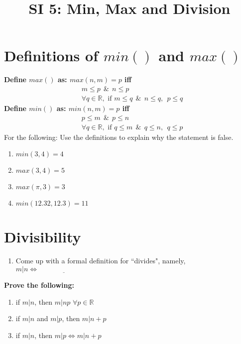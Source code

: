 \documentclass[12pt]{article}
\date{}
\author{}
\title{SI 5: Min, Max and Division}
\begin{document}
	\maketitle
	\section{Definitions of $min()$ and $max()$}
	\textbf{Define $max()$ as: $max(n,m)=p$ iff}
	\begin{align*}
		&m\le p \:\:\&\:\: n\le p\\
		&\forall{q\in\mathbb{R}},\text{ if } m\le q \:\:\&\:\: n\le q,\:\:p\le q
	\end{align*}
	\newline
	\textbf{Define $min()$ as: $min(n,m)=p$ iff}
	\begin{align*}
	& p \le m \:\: \& \:\: p \le n\\
	&\forall{q\in\mathbb{R}},\text{ if } q \le m \:\: \& \:\: q \le n,\:\:q \le p
	\end{align*}
	\newline
	For the following: Use the definitions to explain why the statement is false.
	\begin{enumerate}
		\item $min(3,4)=4$
		\item $max(3,4)=5$
		\item $max(\pi, 3)=3$
		\item $min(12.32,12.3)=11$
	\end{enumerate}
	
	\section{Divisibility}
	\begin{enumerate}[resume]
		\item Come up with a formal definition for ``divides", namely, $m|n \iff\underline{\hspace{3cm}}$
	\end{enumerate}
	\textbf{Prove the following:}
	\begin{enumerate}[resume]
		\item if $ m|n$, then $m|np$ $ \forall{p \in \mathbb{R}}$
		\item if $m|n$ and $m|p$, then $m|n+p$
		\item if $m|n$, then $m|p \iff m|n+p$
	\end{enumerate} 
\end{document}

